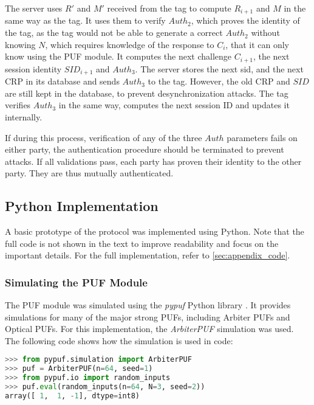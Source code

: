 The server uses $R'$ and $M'$ received from the tag to compute $R_{i+1}$ and $M$ in the same way as the tag.
It uses them to verify $Auth_2$, which proves the identity of the tag, as the tag would not be able to generate
a correct $Auth_2$ without knowing $N$, which requires knowledge of the response to $C_i$,
that it can only know using the PUF module.
It computes the next challenge $C_{i+1}$, the next session identity $SID_{i+1}$ and $Auth_3$.
The server stores the next sid, and the next \ac{CRP} in its database and sends $Auth_3$ to the tag.
However, the old CRP and $SID$ are still kept in the database, to prevent desynchronization attacks.
The tag verifies $Auth_3$ in the same way, computes the next session ID and updates it internally. \cite[][p. 7]{Zhu2019}

If during this process, verification of any of the three $Auth$ parameters fails on either party,
the authentication procedure should be terminated to prevent attacks. If all validations pass,
each party has proven their identity to the other party. They are thus mutually authenticated. \cite[][p. 7]{Zhu2019}

\subsection{Python Implementation}
\label{sec:imp_solution}

A basic prototype of the protocol was implemented using Python.
Note that the full code is not shown in the text to improve readability and focus
on the important details. For the full implementation, refer to \ref{sec:appendix_code}.

\subsubsection{Simulating the PUF Module}

The PUF module was simulated using the \emph{pypuf} Python library \cite{pypuf}.
It provides simulations for many of the major strong PUFs, including Arbiter PUFs and Optical PUFs.
For this implementation, the \emph{ArbiterPUF} simulation was used.
The following code shows how the simulation is used in code:
\begin{lstlisting}[language=Python]
>>> from pypuf.simulation import ArbiterPUF
>>> puf = ArbiterPUF(n=64, seed=1)
>>> from pypuf.io import random_inputs
>>> puf.eval(random_inputs(n=64, N=3, seed=2))
array([ 1,  1, -1], dtype=int8)
\end{lstlisting}

